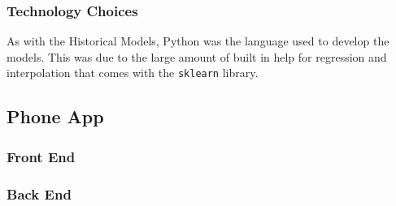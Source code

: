 \subsubsection{Technology Choices}

As with the Historical Models, Python was the language used to develop the models. This was due to the large amount of built in help for regression and interpolation that comes with the \texttt{sklearn} library. 

\subsection{Phone App}

\subsubsection{Front End}

\subsubsection{Back End}

\clearpage